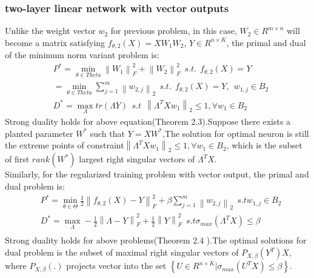 \documentclass{article}
\begin{document}
\subsubsection{two-layer linear network with vector outputs}
Unlike the weight vector $w_2$ for previous problem, in this case, $W_2 \in R^{m\times n}$ will become a matrix satisfying $f_{\theta,2}(X)=XW_1W_2$, $Y\in R^{n\times K}$, the primal and dual of the minimum norm variant problem is:
\begin{equation}
    \begin{aligned}
        &P^*=\min_{\theta \in Theta} \left \| W_1 \right \|_F^2+\left \| W_2 \right \|_F^2\ \ s.t. \ \ f_{\theta,2}(X)=Y\\
        &=\min_{\theta \in Theta}\sum_{j=1}^{m}\left \| w_{2,j} \right \|_2 \ \ s.t. \ \ f_{\theta,2}(X)=Y,\ \ w_{1,j} \in B_2\\
        &D^*= \max_{\Lambda }tr(\Lambda Y)\ \ s.t\ \  \left \| \Lambda^TXw_1 \right \|_2 \leq 1, \forall w_1 \in B_2
    \end{aligned}
\end{equation}
Strong duality holds for above equation(Theorem 2.3\cite{cvxduality1}).Suppose there exists a planted parameter $W^*$ such that $Y=XW^*$,The solution for optimal neuron is still the extreme points of constraint$\left \| \Lambda^TXw_1 \right \|_2 \leq 1, \forall w_1 \in B_2$, which is the subset of first $rank(W^*)$ largest right singular vectors of $\Lambda^TX$.\\
Similarly, for the regularized training problem with vector output, the primal and dual problem is:
\begin{equation}
    \begin{aligned}
        &P^*=\min_{\theta \in \Theta}\frac{1}{2}\left \| f_{\theta,2}(X)-Y \right \|_F^2+\beta \sum_{j=1}^{m}\left \| w_{2,j} \right \|_2 \ \ s.t w_{1,j} \in B_2 \\
        &D^*=\max_{\Lambda} -\frac{1}{2}\left \| \Lambda-Y \right \|_F^2+\frac{1}{2}\left \| Y \right \|_F^2 \ \ s.t \sigma_{max}(\Lambda^TX)\leq \beta\\
    \end{aligned}
\end{equation}
Strong duality holds for above problems(Theorem 2.4 \cite{cvxduality1}).The optimal solutions for dual problem is the subset of maximal right singular vectors of $P_{X,\beta}(Y^T)X$, where $P_{X,\beta}(.)$ projects vector into the set $\left \{ U \in R^{n\times K} | \sigma_{max}(U^TX) \leq \beta \right \}$.
\end{document}
